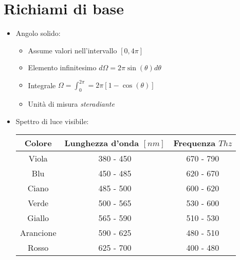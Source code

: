 \documentclass{article}
\begin{document}
\section{Richiami di base}
\begin{itemize}
  \item Angolo solido:
        \begin{itemize}
          \item Assume valori nell'intervallo \( [0, 4 \pi] \)
          \item Elemento infinitesimo \( d \Omega = 2 \pi \sin(\theta) d \theta \)
          \item Integrale \( \displaystyle \Omega = \int_0^{2 \pi} = 2 \pi \left[  1- \cos(\theta) \right] \)
          \item Unità di misura \textit{steradiante}
        \end{itemize}
  \item Spettro di luce visibile:
        \vspace{0.5cm}
        \begin{table}[h]
          \centering
          \renewcommand{\arraystretch}{2}
          \begin{tabular}{|c|c|c|}
            \hline
            \textbf{Colore} & \textbf{Lunghezza d'onda \([nm]\)} & \textbf{Frequenza \(Thz\)} \\ \hline
            Viola           & 380 - 450                          & 670 - 790                  \\ \hline
            Blu             & 450 - 485                          & 620 - 670                  \\ \hline
            Ciano           & 485 - 500                          & 600 - 620                  \\ \hline
            Verde           & 500 - 565                          & 530 - 600                  \\ \hline
            Giallo          & 565 - 590                          & 510 - 530                  \\ \hline
            Arancione       & 590 - 625                          & 480 - 510                  \\ \hline
            Rosso           & 625 - 700                          & 400 - 480                  \\ \hline
          \end{tabular}
        \end{table}
\end{itemize}
\newpage
\end{document}
